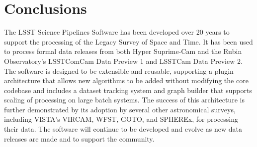 \section{Conclusions}
\label{sec:conclusions}

The LSST Science Pipelines Software has been developed over 20 years to support the processing of the Legacy Survey of Space and Time.
It has been used to process formal data releases from both Hyper Suprime-Cam and the Rubin Observatory's LSSTComCam Data Preview 1 and LSSTCam Data Preview 2.
The software is designed to be extensible and reusable, supporting a plugin architecture that allows new algorithms to be added without modifying the core codebase and includes a dataset tracking system and graph builder that supports scaling of processing on large batch systems.
The success of this architecture is further demonstrated by its adoption by several other astronomical surveys, including VISTA's VIRCAM, WFST, GOTO, and SPHEREx, for processing their data.
The software will continue to be developed and evolve as new data releases are made and to support the community.
